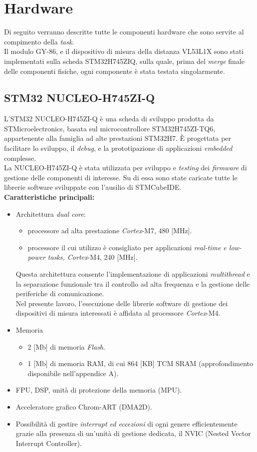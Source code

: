 \chapter{Hardware}
\label{Hardware}
Di seguito verranno descritte tutte le componenti hardware che sono servite al compimento della \textit{task}.\\
Il modulo GY-86, e il dispositivo di misura della distanza VL53L1X sono stati implementati sulla scheda STM32H745ZIQ, sulla quale, prima del \textit{merge} finale delle componenti fisiche, ogni componente è stata testata singolarmente.
\section{STM32 NUCLEO-H745ZI-Q}
L'STM32 NUCLEO-H745ZI-Q è una scheda di sviluppo prodotta da STMicroelectronics, basata sul microcontrollore STM32H745ZI-TQ6, 
appartenente alla famiglia ad alte prestazioni STM32H7. È progettata per facilitare lo sviluppo, il \textit{debug}, e la prototipazione di applicazioni 
\textit{embedded} complesse.\\
La NUCLEO-H745ZI-Q è stata utilizzata per sviluppo e \textit{testing} dei \textit{firmware} di gestione delle componenti di interesse.
Su di essa sono state caricate tutte le librerie software sviluppate con l'ausilio di STMCubeIDE.\\
\textbf{Caratteristiche principali:}
\begin{itemize}
    \item Architettura \textit{dual core}:
    \begin{itemize}
        \item processore ad alta prestazione \textit{Cortex}-M7, 480 [MHz].
        \item processore il cui utilizzo è consigliato per applicazioni \textit{real-time e low-power tasks, Cortex}-M4, 240 [MHz].
    \end{itemize}
        Questa architettura consente l'implementazione di applicazioni \textit{multithread} e la separazione funzionale tra il controllo ad alta frequenza e la gestione delle periferiche di comunicazione.\\
        Nel presente lavoro, l'esecuzione delle librerie software di gestione dei dispositivi di misura interessati è affidata al processore \textit{Cortex}-M4.
    \item Memoria
    \begin{itemize}
        \item 2 [Mb] di memoria \textit{Flash}.
        \item 1 [Mb] di memoria RAM, di cui 864 [KB] TCM SRAM (approfondimento disponibile nell'appendice A).
    \end{itemize}
    \item FPU, DSP, unità di protezione della memoria (MPU).  
    \item Acceleratore grafico Chrom-ART (DMA2D).
    \item Possibilità di gestire \textit{interrupt ed eccezioni} di ogni genere efficientemente grazie alla presenza di un'unità di gestione dedicata, il NVIC (Nested Vector Interrupt Controller).\\
\end{itemize}
